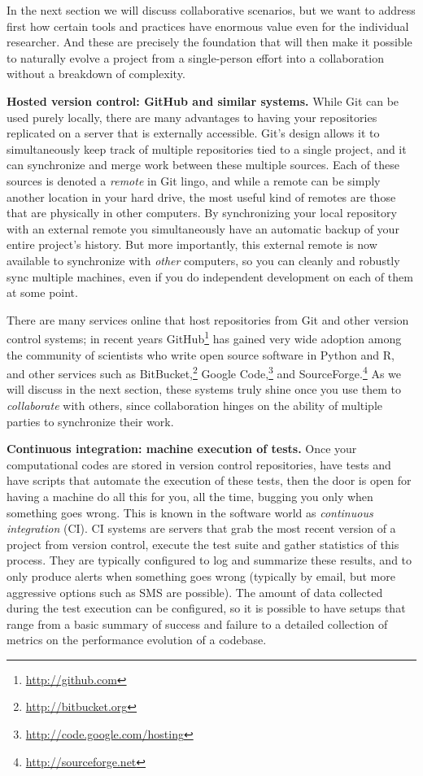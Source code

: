 \documentclass[ChapterTOCs,krantz2]{krantz} %
\newcommand{\blockpar}[1]{\vspace*{3mm} \noindent \textbf{#1}}
\begin{document}
In the next section we will discuss collaborative scenarios, but we want to
address first how certain tools and practices have enormous value even for the
individual researcher.  And these are precisely the foundation that will then
make it possible to naturally evolve a project from a single-person effort into
a collaboration without a breakdown of complexity.

\blockpar{Hosted version control: GitHub and similar systems.}  While Git can
be used purely locally, there are many advantages to having your repositories
replicated on a server that is externally accessible.  Git's design allows it
to simultaneously keep track of multiple repositories tied to a single project,
and it can synchronize and merge work between these multiple sources.  Each of
these sources is denoted a \emph{remote} in Git lingo, and while a remote can
be simply another location in your hard drive, the most useful kind of remotes
are those that are physically in other computers.  By synchronizing your local
repository with an external remote you simultaneously have an automatic backup
of your entire project's history.  But more importantly, this external remote
is now available to synchronize with \emph{other} computers, so you can cleanly
and robustly sync multiple machines, even if you do independent development on
each of them at some point.

There are many services online that host repositories from Git and other
version control systems; in recent years
GitHub\footnote{\url{http://github.com}} has gained very wide adoption among
the community of scientists who write open source software in Python and R, and
other services such as BitBucket,\footnote{\url{http://bitbucket.org}}
Google Code,\footnote{\url{http://code.google.com/hosting}} and
SourceForge.\footnote{\url{http://sourceforge.net}}  As we will
discuss in the next section, these systems truly shine once you use them to
\emph{collaborate} with others, since collaboration hinges on the ability of
multiple parties to synchronize their work.

\blockpar{Continuous integration: machine execution of tests.} Once your
computational codes are stored in version control repositories, have tests and
have scripts that automate the execution of these tests, then the door is open
for having a machine do all this for you, all the time, bugging you only when
something goes wrong.  This is known in the software world as \emph{continuous
  integration} (CI). CI systems are servers that grab the most recent
version of a project from version control, execute the test suite and gather
statistics of this process.  They are typically configured to log and summarize
these results, and to only produce alerts when something goes wrong (typically
by email, but more aggressive options such as SMS are possible).  The amount of
data collected during the test execution can be configured, so it is possible
to have setups that range from a basic summary of success and failure to a
detailed collection of metrics on the performance evolution of a codebase.
\end{document}
